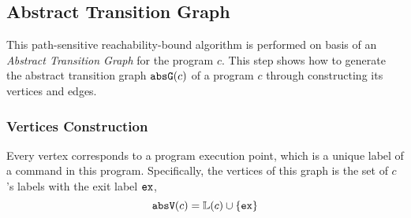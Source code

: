   

\subsection{Abstract Transition Graph}
\label{sec:abs_prog}

This path-sensitive reachability-bound algorithm
is performed on basis of an \emph{Abstract Transition Graph} for the program $c$.
This step shows how to generate the abstract transition graph $\mathtt{abs}{\mathtt{G}}(c)$ of a
program $c$ through constructing its vertices and edges.

\subsubsection{Vertices Construction}
\label{sec:abs_prog-vertex}
Every 
vertex corresponds to a program execution point, which is a unique
label of a command in this program.
Specifically,
the vertices of this graph is the set of $c$'s labels with the exit label ${\mathtt{ex}}$, 
\[ 
  \mathtt{abs}{\mathtt{V}}(c) = \mathbb{L}(c)\cup\{{\mathtt{ex}}\}
  \]

